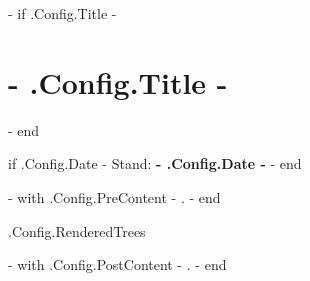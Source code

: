 \documentclass[10pt,paper=a4,ngerman,DIV=15,BCOR=0mm,%
{{ if .Config.DocumentOptions -}}
{{ .Config.DocumentOptions }}%
{{- end }}%
]{scrartcl}
\begin{document}
{{- if .Config.Title -}}
\section*{ {{- .Config.Title -}} }
{{- end }}

{{ if .Config.Date -}}
Stand: \textbf{ {{- .Config.Date -}} }
{{- end }}


{{- with .Config.PreContent -}}
{{ . }}
{{- end }}


{{ .Config.RenderedTrees }}


{{- with .Config.PostContent -}}
{{ . }}
{{- end }}
\end{document}
